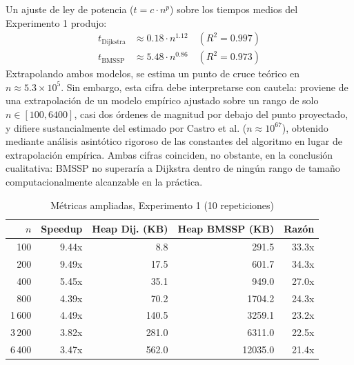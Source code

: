 Un ajuste de ley de potencia ($t = c \cdot n^p$) sobre los tiempos medios del
Experimento 1 produjo:
\begin{align}
t_{\text{Dijkstra}} &\approx 0.18 \cdot n^{1.12} \quad (R^2 = 0.997) \\
t_{\text{BMSSP}} &\approx 5.48 \cdot n^{0.86} \quad (R^2 = 0.973)
\end{align}
Extrapolando ambos modelos, se estima un punto de cruce te\'orico en
$n \approx 5.3 \times 10^5$. Sin embargo, esta cifra debe interpretarse con
cautela: proviene de una extrapolaci\'on de un modelo emp\'irico ajustado sobre
un rango de solo $n\in[100,6400]$, casi dos \'ordenes de magnitud por debajo
del punto proyectado, y difiere sustancialmente del estimado por Castro et al.
\cite{implbmssp2025} ($n\approx10^{67}$), obtenido mediante an\'alisis
asint\'otico rigoroso de las constantes del algoritmo en lugar de extrapolaci\'on
emp\'irica. Ambas cifras coinciden, no obstante, en la conclusi\'on cualitativa:
BMSSP no superar\'ia a Dijkstra dentro de ning\'un rango de tama\~no
computacionalmente alcanzable en la pr\'actica.

\begin{table}[t]
\caption{M\'etricas ampliadas, Experimento 1 (10 repeticiones)}
\label{tab:metricas7}
\centering
\small
\begin{tabular}{@{}rrrrr@{}}
\toprule
$n$ & Speedup & Heap Dij. (KB) & Heap BMSSP (KB) & Raz\'on \\
\midrule
100    & 9.44x & 8.8   & 291.5   & 33.3x \\
200    & 9.49x & 17.5  & 601.7   & 34.3x \\
400    & 5.45x & 35.1  & 949.0   & 27.0x \\
800    & 4.39x & 70.2  & 1704.2  & 24.3x \\
1\,600 & 4.49x & 140.5 & 3259.1  & 23.2x \\
3\,200 & 3.82x & 281.0 & 6311.0  & 22.5x \\
6\,400 & 3.47x & 562.0 & 12035.0 & 21.4x \\
\bottomrule
\end{tabular}
\end{table}

